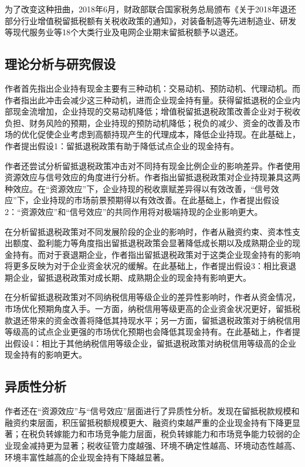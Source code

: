 \documentclass{article}
\begin{document}
为了改变这种扭曲，2018年6月，财政部联合国家税务总局颁布《关于2018年退还部分行业增值税留抵税额有关税收政策的通知》，对装备制造等先进制造业、研发等现代服务业等18个大类行业及电网企业期末留抵税额予以退还。

\subsection{理论分析与研究假设}
\indent 作者首先指出企业持有现金主要有三种动机：交易动机、预防动机、代理动机。而作者指出此冲击会减少这三种动机，进而企业现金持有量。获得留抵退税的企业内部现金流增加，企业持现的交易动机降低；增值税留抵退税政策改善企业对于税收负担、财务风险的预期，企业持现的预防动机降低；税负的减少、资金的改善及市场的优化促使企业考虑到高额持现产生的代理成本，降低企业持现。在此基础上，作者提出假设1：留抵退税政策有助于降低试点企业的现金持有。

作者还尝试分析留抵退税政策冲击对不同持有现金比例企业的影响差异。作者使用资源效应与信号效应的角度进行分析。作者指出留抵退税政策对企业持现兼具这两种效应。在“资源效应”下，企业持现的税收禀赋差异得以有效改善，“信号效应”下，企业持现的市场前景预期得以有效改善。在此基础上，作者提出假设2：“资源效应”和“信号效应”的共同作用将对极端持现的企业影响更大。

在分析留抵退税政策对不同发展阶段的企业的影响时，作者从融资约束、资本性支出额度、盈利能力等角度指出留抵退税政策会显著降低成长期以及成熟期企业的现金持有。而对于衰退期企业，作者指出留抵退税政策对于这类企业现金持有的影响将更多反映为对于企业资金状况的缓解。在此基础上，作者提出假设3：相比衰退期企业，留抵退税政策对成长期、成熟期企业的现金持有影响更大。

在分析留抵退税政策对不同纳税信用等级企业的差异性影响时，作者从资金情况，市场优化预期角度入手。一方面，纳税信用等级更高的企业资金状况更好，留抵税款退还带来的资金改善将降低其持现水平；另一方面，留抵退税政策对于纳税信用等级高的试点企业更强的市场优化预期也会降低其现金持有。在此基础上，作者提出假设4：相比于其他纳税信用等级企业，留抵退税政策对纳税信用等级高的企业现金持有的影响更大。

\subsection{异质性分析}
\indent 作者还在“资源效应”与“信号效应”层面进行了异质性分析。发现在留抵税款规模和融资约束层面，积压留抵税额规模更大、融资约束越严重的企业现金持有下降更显著；在税负转嫁能力和市场竞争能力层面，税负转嫁能力和市场竞争能力较弱的企业现金减持更为显著；税收征管力度越强、环境不确定性越高、环境动态性越高、环境丰富性越高的企业现金持有下降越显著。
\end{document}
